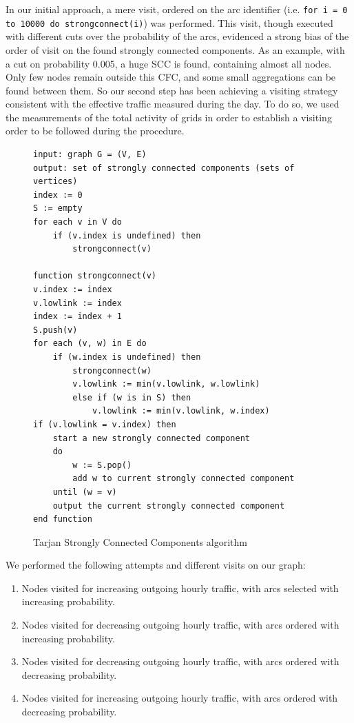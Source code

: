 \documentclass[12pt,a4paper]{article}
\begin{document}
In our initial approach, a mere visit, ordered on the arc identifier (i.e. \texttt{for i = 0 to 10000 do strongconnect(i)}) was performed. This visit, though executed with different cuts over the probability of the arcs, evidenced
a strong bias of the order of visit on the found strongly connected components.
As an example, with a cut on probability 0.005, a huge SCC is found, containing almost all nodes. Only few nodes remain
outside this CFC, and some small aggregations can be found between them.
So our second step has been achieving a visiting strategy consistent with the effective traffic measured during the day.
To do so, we used the measurements of the total activity of grids in order to establish a visiting order to be 
followed during the procedure.
\begin{figure}
\begin{verbatim}
input: graph G = (V, E)
output: set of strongly connected components (sets of vertices)
index := 0
S := empty
for each v in V do
	if (v.index is undefined) then
		strongconnect(v)
		
function strongconnect(v)
v.index := index
v.lowlink := index
index := index + 1
S.push(v)
for each (v, w) in E do
	if (w.index is undefined) then
		strongconnect(w)
		v.lowlink := min(v.lowlink, w.lowlink)
		else if (w is in S) then
			v.lowlink := min(v.lowlink, w.index)
if (v.lowlink = v.index) then
	start a new strongly connected component
	do
		w := S.pop()
		add w to current strongly connected component
	until (w = v)
	output the current strongly connected component
end function
\end{verbatim}
\caption{Tarjan Strongly Connected Components algorithm}
\label{alg:tarjan}
\end{figure}
We performed the following attempts and different visits on our graph:
\begin{enumerate}
\item Nodes visited for increasing outgoing hourly traffic, with arcs selected with increasing probability. 
\item Nodes visited for decreasing outgoing hourly traffic, with arcs ordered with increasing probability.
\item Nodes visited for decreasing outgoing hourly traffic, with arcs ordered with decreasing probability.
\item Nodes visited for increasing outgoing hourly traffic, with arcs ordered with decreasing probability.
\end{enumerate}
\end{document}
